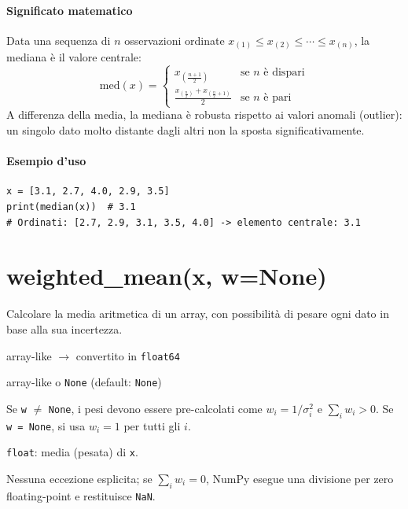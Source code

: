 \paragraph{Significato matematico}
Data una sequenza di $n$ osservazioni ordinate $x_{(1)} \leq x_{(2)} \leq \cdots \leq x_{(n)}$, la mediana è il valore centrale:
$$
\text{med}(x) =
\begin{cases}
  x_{\left(\frac{n+1}{2}\right)} & \text{se } n \text{ è dispari} \\[2pt]
  \frac{x_{\left(\frac{n}{2}\right)} + x_{\left(\frac{n}{2}+1\right)}}{2} & \text{se } n \text{ è pari}
\end{cases}
$$
A differenza della media, la mediana è robusta rispetto ai valori anomali (outlier): un singolo dato molto distante dagli altri non la sposta significativamente.

\paragraph{Esempio d'uso}
\begin{verbatim}
x = [3.1, 2.7, 4.0, 2.9, 3.5]
print(median(x))  # 3.1
# Ordinati: [2.7, 2.9, 3.1, 3.5, 4.0] -> elemento centrale: 3.1
\end{verbatim}

\newpage
\section{\texorpdfstring{weighted\_mean(x, w=None)}{weighted\_mean(x, w=None)}}
\label{sec:weighted-mean}
\begin{apidesc}
  \item[\textbf{Scopo}]
    Calcolare la media aritmetica di un array, con possibilità di pesare ogni dato
    in base alla sua incertezza.
  \item[\textbf{Parametri}]\hfill
    \begin{description}[font=\normalfont\ttfamily\bfseries, labelwidth=1.5em, leftmargin=2em, itemsep=1pt, parsep=0pt, topsep=1pt]
      \item[x] array-like $\to$ convertito in \texttt{float64}
      \item[w] array-like o \texttt{None} (default: \texttt{None})
    \end{description}
  \item[\textbf{Vincoli}]
    Se \texttt{w} $\neq$ \texttt{None}, i pesi devono essere pre-calcolati come
    $w_i = 1/\sigma_i^2$ e $\sum_i w_i > 0$. Se \texttt{w = None}, si usa
    $w_i = 1$ per tutti gli $i$.
  \item[\textbf{Restituisce}]
    \texttt{float}: media (pesata) di \texttt{x}.
  \item[\textbf{Eccezioni}]
    Nessuna eccezione esplicita; se $\sum_i w_i = 0$, NumPy esegue una divisione
    per zero floating-point e restituisce \texttt{NaN}.
\end{apidesc}

